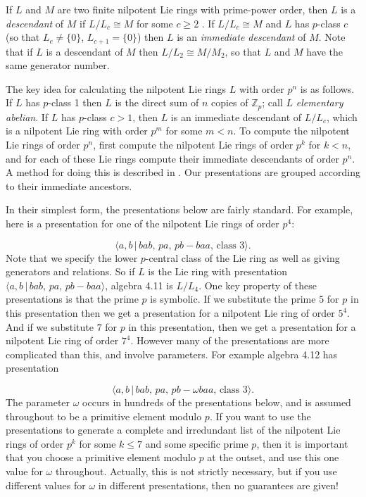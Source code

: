 \documentclass[10pt]{article}
\begin{document}
If $L$ and $M$ are two finite nilpotent Lie rings with prime-power order,
then $L$ is a \textit{descendant} of $M$ if $L/L_c\cong M$ for some $c\geq 2$%
. If $L/L_c\cong M$ and $L$ has $p$-class $c$ (so that $L_c\neq \{0\}$, $%
L_{c+1}=\{0\}$) then $L$ is an \textit{immediate descendant} of $M$. Note
that if $L$ is a descendant of $M$ then $L/L_2\cong M/M_2$, so that $L$ and $%
M$ have the same generator number.

The key idea for calculating the nilpotent Lie rings $L$ with order $p^{n}$
is as follows. If $L$ has $p$-class 1 then $L$ is the direct sum of $n$
copies of $\mathbb{Z}_{p}$; call $L$ \textit{elementary abelian}. If $L$ has 
$p$-class $c>1$, then $L$ is an immediate descendant of $L/L_{c}$, which is
a nilpotent Lie ring with order $p^{m}$ for some $m<n$. To compute the
nilpotent Lie rings of order $p^{n}$, first compute the nilpotent Lie rings
of order $p^{k}$ for $k<n$, and for each of these Lie rings compute their
immediate descendants of order $p^{n}$. A method for doing this is described
in \cite{newobvl}. Our presentations are grouped according to their
immediate ancestors.

In their simplest form, the presentations below are fairly standard. For
example, here is a presentation for one of the nilpotent Lie rings of order $%
p^{4}$:

\begin{equation}
\langle a,b\,|\,bab,\,pa,\,pb-baa,\,\text{class }3\rangle .  \tag{4.11}
\end{equation}%
Note that we specify the lower $p$-central class of the Lie ring as well as
giving generators and relations. So if $L$ is the Lie ring with presentation 
$\langle a,b\,|\,bab,\,pa,\,pb-baa\rangle $, algebra 4.11 is $L/L_{4}$. One
key property of these presentations is that the prime $p$ is symbolic. If we
substitute the prime $5$ for $p$ in this presentation then we get a
presentation for a nilpotent Lie ring of order $5^{4}$. And if we substitute 
$7$ for $p$ in this presentation, then we get a presentation for a nilpotent
Lie ring of order $7^{4}$. However many of the presentations are more
complicated than this, and involve parameters. For example algebra 4.12 has
presentation

\begin{equation}
\langle a,b\,|\,bab,\,pa,\,pb-\omega baa,\,\text{class }3\rangle . 
\tag{4.12}
\end{equation}%
The parameter $\omega $ occurs in hundreds of the presentations below, and
is assumed throughout to be a primitive element modulo $p$. If you want to
use the presentations to generate a complete and irredundant list of the
nilpotent Lie rings of order $p^{k}$ for some $k\leq 7$ and some specific
prime $p$, then it is important that you choose a primitive element modulo $%
p $ at the outset, and use this one value for $\omega $ throughout.
Actually, this is not strictly necessary, but if you use different values
for $\omega $ in different presentations, then no guarantees are given!
\end{document}
